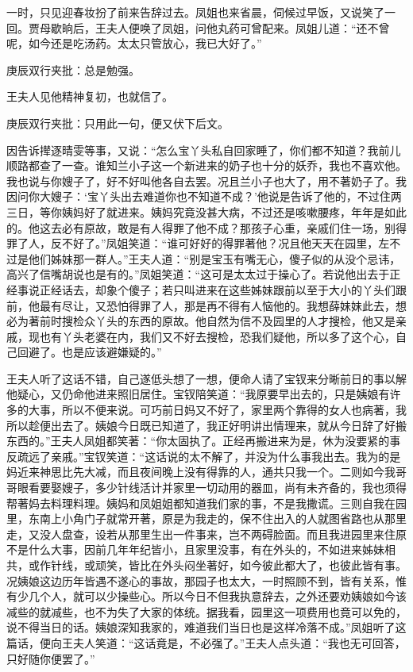 \begin{parag}
    一时，只见迎春妆扮了前来告辞过去。凤姐也来省晨，伺候过早饭，又说笑了一回。贾母歇晌后，王夫人便唤了凤姐，问他丸药可曾配来。凤姐儿道：“还不曾呢，如今还是吃汤药。太太只管放心，我已大好了。”\begin{note}庚辰双行夹批：总是勉强。\end{note}王夫人见他精神复初，也就信了。\begin{note}庚辰双行夹批：只用此一句，便又伏下后文。\end{note}因告诉撵逐晴雯等事，又说：“怎么宝丫头私自回家睡了，你们都不知道？我前儿顺路都查了一查。谁知兰小子这一个新进来的奶子也十分的妖乔，我也不喜欢他。我也说与你嫂子了，好不好叫他各自去罢。况且兰小子也大了，用不著奶子了。我因问你大嫂子：‘宝丫头出去难道你也不知道不成？’他说是告诉了他的，不过住两三日，等你姨妈好了就进来。姨妈究竟没甚大病，不过还是咳嗽腰疼，年年是如此的。他这去必有原故，敢是有人得罪了他不成？那孩子心重，亲戚们住一场，别得罪了人，反不好了。”凤姐笑道：“谁可好好的得罪著他？况且他天天在园里，左不过是他们姊妹那一群人。”王夫人道：“别是宝玉有嘴无心，傻子似的从没个忌讳，高兴了信嘴胡说也是有的。”凤姐笑道：“这可是太太过于操心了。若说他出去于正经事说正经话去，却象个傻子；若只叫进来在这些姊妹跟前以至于大小的丫头们跟前，他最有尽让，又恐怕得罪了人，那是再不得有人恼他的。我想薛妹妹此去，想必为著前时搜检众丫头的东西的原故。他自然为信不及园里的人才搜检，他又是亲戚，现也有丫头老婆在内，我们又不好去搜检，恐我们疑他，所以多了这个心，自己回避了。也是应该避嫌疑的。”
\end{parag}


\begin{parag}
    王夫人听了这话不错，自己遂低头想了一想，便命人请了宝钗来分晰前日的事以解他疑心，又仍命他进来照旧居住。宝钗陪笑道：“我原要早出去的，只是姨娘有许多的大事，所以不便来说。可巧前日妈又不好了，家里两个靠得的女人也病著，我所以趁便出去了。姨娘今日既已知道了，我正好明讲出情理来，就从今日辞了好搬东西的。”王夫人凤姐都笑著：“你太固执了。正经再搬进来为是，休为没要紧的事反疏远了亲戚。”宝钗笑道：“这话说的太不解了，并没为什么事我出去。我为的是妈近来神思比先大减，而且夜间晚上没有得靠的人，通共只我一个。二则如今我哥哥眼看要娶嫂子，多少针线活计并家里一切动用的器皿，尚有未齐备的，我也须得帮著妈去料理料理。姨妈和凤姐姐都知道我们家的事，不是我撒谎。三则自我在园里，东南上小角门子就常开著，原是为我走的，保不住出入的人就图省路也从那里走，又没人盘查，设若从那里生出一件事来，岂不两碍脸面。而且我进园里来住原不是什么大事，因前几年年纪皆小，且家里没事，有在外头的，不如进来姊妹相共，或作针线，或顽笑，皆比在外头闷坐著好，如今彼此都大了，也彼此皆有事。况姨娘这边历年皆遇不遂心的事故，那园子也太大，一时照顾不到，皆有关系，惟有少几个人，就可以少操些心。所以今日不但我执意辞去，之外还要劝姨娘如今该减些的就减些，也不为失了大家的体统。据我看，园里这一项费用也竟可以免的，说不得当日的话。姨娘深知我家的，难道我们当日也是这样冷落不成。”凤姐听了这篇话，便向王夫人笑道：“这话竟是，不必强了。”王夫人点头道：“我也无可回答，只好随你便罢了。”
\end{parag}



